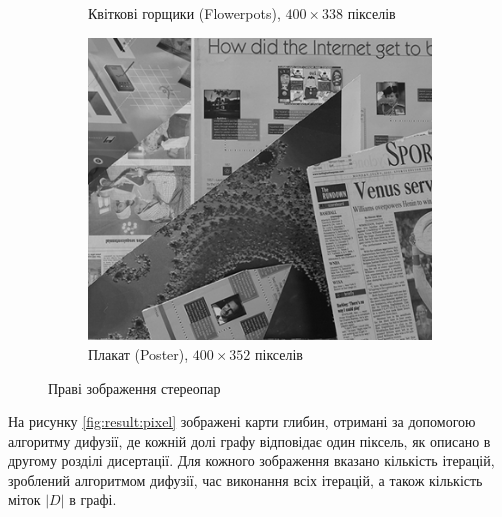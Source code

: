 \begin{figure}[h]
\begin{subfigure}[t]{0.32\textwidth}
        \caption{Квіткові горщики (Flowerpots), $400 \times 338$ пікселів}
        \label{fig:flowerpots:right}
    \end{subfigure}
    \hfill
    \begin{subfigure}[t]{0.32\textwidth}
        \centering
        \includegraphics[width=\textwidth]{images/poster_right}
        \caption{Плакат (Poster), $400 \times 352$ пікселів}
        \label{fig:poster:right}
    \end{subfigure}
    \caption{Праві зображення стереопар}
    \label{fig:stereopair:right}
\end{figure}

На рисунку \ref{fig:result:pixel} зображені карти глибин,
отримані за допомогою алгоритму дифузії,
де кожній долі графу відповідає один піксель,
як описано в другому розділі дисертації.
Для кожного зображення вказано кількість ітерацій, зроблений алгоритмом дифузії,
час виконання всіх ітерацій, а також кількість міток $\left| D \right|$ в графі.

